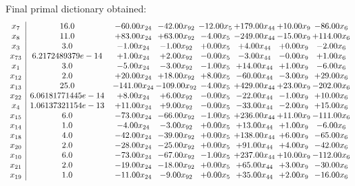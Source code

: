 \documentclass[8pt]{article}
\begin{document}
 Final primal dictionary obtained: 
\[\begin{array}{c| c c@{\hskip 2pt} c@{\hskip 2pt} c@{\hskip 2pt} c@{\hskip 2pt} c@{\hskip 2pt} c@{\hskip 2pt} }
 x_{7}   &  16.0 & -60.00 x_{24} & -42.00 x_{92} & -12.00 x_{5} & + 179.00 x_{44} & + 10.00 x_{9} & -86.00 x_{6}\\
 x_{8}   &  11.0 & + 83.00 x_{24} & + 63.00 x_{92} & -4.00 x_{5} & -249.00 x_{44} & -15.00 x_{9} & + 114.00 x_{6}\\
 x_{3}   &  3.0 & -1.00 x_{24} & -1.00 x_{92} & +  0.00 x_{5} & +  4.00 x_{44} & +  0.00 x_{9} & -2.00 x_{6}\\
 x_{73}   &  6.2172489379e-14 & +  1.00 x_{24} & +  2.00 x_{92} & -0.00 x_{5} & -3.00 x_{44} & -0.00 x_{9} & +  1.00 x_{6}\\
 x_{1}   &  3.0 & -5.00 x_{24} & -3.00 x_{92} & -1.00 x_{5} & + 14.00 x_{44} & +  1.00 x_{9} & -6.00 x_{6}\\
 x_{12}   &  2.0 & + 20.00 x_{24} & + 18.00 x_{92} & +  8.00 x_{5} & -60.00 x_{44} & -3.00 x_{9} & + 29.00 x_{6}\\
 x_{13}   &  25.0 & -141.00 x_{24} & -109.00 x_{92} & -4.00 x_{5} & + 429.00 x_{44} & + 23.00 x_{9} & -202.00 x_{6}\\
 x_{22}   &  6.06181771445e-14 & +  8.00 x_{24} & +  6.00 x_{92} & -0.00 x_{5} & -22.00 x_{44} & -1.00 x_{9} & + 10.00 x_{6}\\
 x_{4}   &  1.06137321154e-13 & + 11.00 x_{24} & +  9.00 x_{92} & -0.00 x_{5} & -33.00 x_{44} & -2.00 x_{9} & + 15.00 x_{6}\\
 x_{15}   &  6.0 & -73.00 x_{24} & -66.00 x_{92} & -1.00 x_{5} & + 236.00 x_{44} & + 11.00 x_{9} & -111.00 x_{6}\\
 x_{14}   &  1.0 & -4.00 x_{24} & -3.00 x_{92} & +  0.00 x_{5} & + 13.00 x_{44} & +  1.00 x_{9} & -6.00 x_{6}\\
 x_{18}   &  4.0 & -42.00 x_{24} & -39.00 x_{92} & +  0.00 x_{5} & + 138.00 x_{44} & +  6.00 x_{9} & -65.00 x_{6}\\
 x_{20}   &  2.0 & -28.00 x_{24} & -25.00 x_{92} & +  0.00 x_{5} & + 91.00 x_{44} & +  4.00 x_{9} & -42.00 x_{6}\\
 x_{10}   &  6.0 & -73.00 x_{24} & -67.00 x_{92} & -1.00 x_{5} & + 237.00 x_{44} & + 10.00 x_{9} & -112.00 x_{6}\\
 x_{21}   &  2.0 & -19.00 x_{24} & -18.00 x_{92} & +  0.00 x_{5} & + 65.00 x_{44} & +  3.00 x_{9} & -30.00 x_{6}\\
 x_{19}   &  1.0 & -11.00 x_{24} & -9.00 x_{92} & +  0.00 x_{5} & + 35.00 x_{44} & +  2.00 x_{9} & -16.00 x_{6}\\

\end{array}\]
\end{document}
